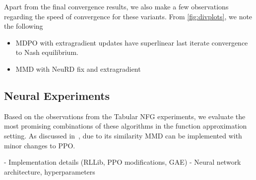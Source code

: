 Apart from the final convergence results, we also make a few observations regarding the speed of
convergence for these variants.
From \ref{fig:divplots}, we note the following

\begin{itemize}
	\item{MDPO with
	            extragradient updates have superlinear last iterate convergence to Nash equilibrium.
	      }
	\item{MMD with NeuRD fix and extragradient }
\end{itemize}

\subsection{Neural Experiments}

Based on the observations from the Tabular NFG experiments, we evaluate the most promising
combinations of these algorithms in the function approximation setting.
As discussed in~\cite{sokotaUnified2023}, due to its similarity MMD can be implemented with minor
changes to PPO.

- Implementation details (RLLib, PPO modifications, GAE)
- Neural network architecture, hyperparameters

